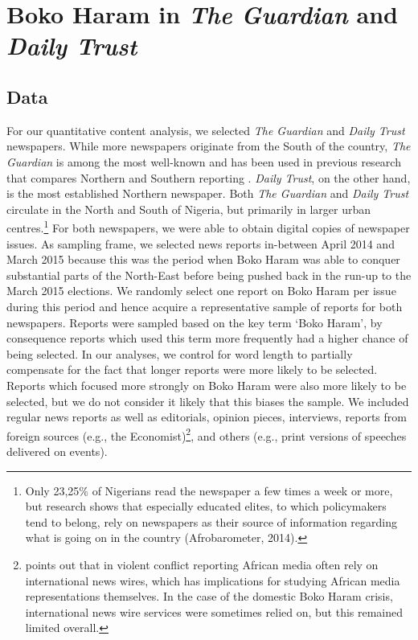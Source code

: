 \section{Boko Haram in \textit{The Guardian} and \textit{Daily Trust}}
\label{sec:44}
\subsection{Data}
\label{sec:441}
For our quantitative content analysis, we selected \textit{The Guardian} and \textit{Daily Trust} newspapers. While more newspapers originate from the South of the country, \textit{The Guardian} is among the most well-known and has been used in previous research that compares Northern and Southern reporting \citep{Ette2018, Yushau2015}. \textit{Daily Trust}, on the other hand, is the most established Northern newspaper. Both \textit{The Guardian} and \textit{Daily Trust} circulate in the North and South of Nigeria, but primarily in larger urban centres.\footnote{Only 23,25\% of Nigerians read the newspaper a few times a week or more, but research shows that especially educated elites, to which policymakers tend to belong, rely on newspapers as their source of information regarding what is going on in the country (Afrobarometer, 2014).} For both newspapers, we were able to obtain digital copies of newspaper issues. As sampling frame, we selected news reports in-between April 2014 and March 2015 because this was the period when Boko Haram was able to conquer substantial parts of the North-East before being pushed back in the run-up to the March 2015 elections. We randomly select one report on Boko Haram per issue during this period and hence acquire a representative sample of reports for both newspapers. Reports were sampled based on the key term `Boko Haram', by consequence reports which used this term more frequently had a higher chance of being selected. In our analyses, we control for word length to partially compensate for the fact that longer reports were more likely to be selected. Reports which focused more strongly on Boko Haram were also more likely to be selected, but we do not consider it likely that this biases the sample. We included regular news reports as well as editorials, opinion pieces, interviews, reports from foreign sources (e.g., the Economist)\footnote{\cite{Wahutu2018a} points out that in violent conflict reporting African media often rely on international news wires, which has implications for studying African media representations themselves. In the case of the domestic Boko Haram crisis, international news wire services were sometimes relied on, but this remained limited overall.}, and others (e.g., print versions of speeches delivered on events). 

